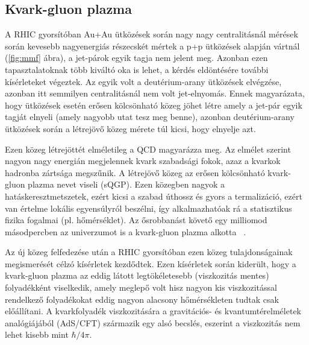 \documentclass[10pt,a4paper]{article}
\numberwithin{equation}{subsection}
\numberwithin{figure}{section}
\begin{document}
\subsection{Kvark-gluon plazma}

A RHIC gyorsítóban Au+Au ütközések során nagy nagy centralitásnál mérések során kevesebb nagyenergiás részecskét mértek a p+p ütközések alapján vártnál (\ref{fig:mmf} ábra), a jet-párok egyik tagja nem jelent meg. Azonban ezen tapasztalatoknak több kiváltó oka is lehet, a kérdés eldöntésére további kísérleteket végeztek. Az egyik volt a deutérium-arany ütközések elvégzése, azonban itt semmilyen centralitásnál nem volt jet-elnyomás. Ennek magyarázata, hogy ütközések esetén erősen kölcsönható közeg jöhet létre amely a jet-pár egyik tagját elnyeli (amely nagyobb utat tesz meg benne), azonban deutérium-arany ütközések során a létrejövő közeg mérete túl kicsi, hogy elnyelje azt.

Ezen közeg létrejöttét elméletileg a QCD magyarázza meg. Az elmélet szerint nagyon nagy energián megjelennek kvark szabadsági fokok, azaz a kvarkok hadronba zártsága megszűnik. A létrejövő közeg az erősen kölcsönható kvark-gluon plazma nevet viseli (sQGP). Ezen közegben nagyok a hatáskeresztmetszetek, ezért kicsi a szabad úthossz és gyors a termalizáció, ezért van értelme lokális egyensúlyról beszélni, így alkalmazhatóak rá a statisztikus fizika fogalmai (pl. hőmérséklet). Az ősrobbanást követő egy milliomod másodpercben az univerzumot is a kvark-gluon plazma alkotta ~\cite{SWeinberg}.

Az új közeg felfedezése után a RHIC gyorsítóban ezen közeg tulajdonságainak megismerését célzó kísérletek kezdődtek. Ezen kísérletek során kiderült, hogy a kvark-gluon plazma az eddig látott legtökéletesebb (viszkozitás mentes) folyadékként viselkedik, amely meglepő volt hisz nagyon kis viszkozitással rendelkező folyadékokat eddig nagyon alacsony hőmérsékleten tudtak csak előállítani. A kvarkfolyadék viszkozitására a gravitációs- és kvantumtérelméletek analógiájából (AdS/CFT) származik egy alsó becslés, eszerint a viszkozitás nem lehet kisebb mint $\hbar/4\pi$.
\end{document}
